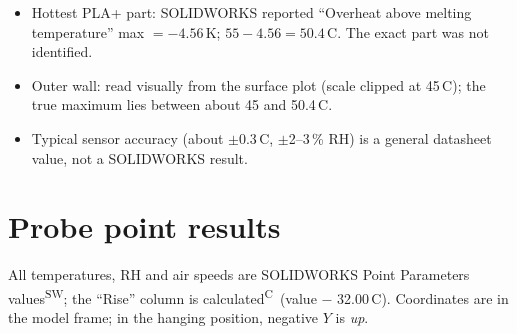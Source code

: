 \documentclass[11pt,a4paper]{article}
\newcommand{\SW}{\textsuperscript{SW}}
\newcommand{\CALC}{\textsuperscript{C}}
\begin{document}
\small
\begin{itemize}
\item Hottest PLA+ part: SOLIDWORKS reported ``Overheat above melting temperature'' max $=-4.56$\,K;
      $55-4.56=50.4$\,\textdegree C. The exact part was not identified.
\item Outer wall: read visually from the surface plot (scale clipped at 45\,\textdegree C); the true
      maximum lies between about 45 and 50.4\,\textdegree C.
\item Typical sensor accuracy (about $\pm$0.3\,\textdegree C, $\pm$2--3\,\% RH) is a general datasheet value, not a SOLIDWORKS result.
\end{itemize}
\normalsize

\section{Probe point results}
All temperatures, RH and air speeds are SOLIDWORKS Point Parameters values\SW; the ``Rise'' column is calculated\CALC\ (value $-$ 32.00\,\textdegree C).
Coordinates are in the model frame; in the hanging position, negative $Y$ is \emph{up}.
\end{document}
